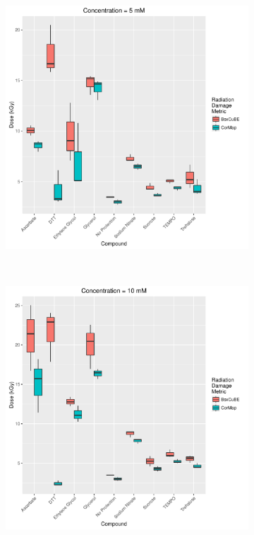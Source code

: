 \begin{figure}
    \ContinuedFloat
    \centering
    \begin{subfigure}[b]{0.72\textwidth}
            \centering
            \includegraphics[width=\textwidth]{figures/saxs/Conc_5_dose.pdf}
            \caption{}
            \label{fig:SAXS Metric comparison - 5mM}
    \end{subfigure}
    \\
    \begin{subfigure}[b]{0.72\textwidth}
            \centering
            \includegraphics[width=\textwidth]{figures/saxs/Conc_10_dose.pdf}

\end{subfigure}
\end{figure}
